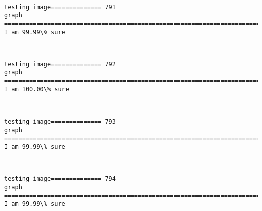 \documentclass[11pt]{article}
\begin{document}
    \begin{center}
    \end{center}
    { \hspace*{\fill} \\}
    
    \begin{Verbatim}[commandchars=\\\{\}]
testing image============== 791
graph
============================================================================
I am 99.99\% sure

    \end{Verbatim}

    \begin{center}
    \end{center}
    { \hspace*{\fill} \\}
    
    \begin{Verbatim}[commandchars=\\\{\}]
testing image============== 792
graph
============================================================================
I am 100.00\% sure

    \end{Verbatim}

    \begin{center}
    \end{center}
    { \hspace*{\fill} \\}
    
    \begin{Verbatim}[commandchars=\\\{\}]
testing image============== 793
graph
============================================================================
I am 99.99\% sure

    \end{Verbatim}

    \begin{center}
    \end{center}
    { \hspace*{\fill} \\}
    
    \begin{Verbatim}[commandchars=\\\{\}]
testing image============== 794
graph
============================================================================
I am 99.99\% sure

    \end{Verbatim}
\end{document}
